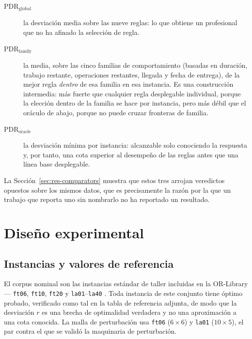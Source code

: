 \documentclass[a4paper,fleqn]{cas-sc}
\begin{document}
\begin{description}
\item[$\mathrm{PDR}_{\mathrm{global}}$] la desviación media sobre las nueve
reglas: lo que obtiene un profesional que no ha afinado la selección de regla.
\item[$\mathrm{PDR}_{\mathrm{family}}$] la media, sobre las cinco familias de
comportamiento (basadas en duración, trabajo restante, operaciones restantes,
llegada y fecha de entrega), de la mejor regla \emph{dentro} de esa familia en
esa instancia. Es una construcción intermedia: más fuerte que cualquier regla
desplegable individual, porque la elección dentro de la familia se hace por
instancia, pero más débil que el oráculo de abajo, porque no puede cruzar
fronteras de familia.
\item[$\mathrm{PDR}_{\mathrm{oracle}}$] la desviación mínima por instancia:
alcanzable solo conociendo la respuesta y, por tanto, una cota superior al
desempeño de las reglas antes que una línea base desplegable.
\end{description}

La Sección~\ref{sec:res-comparators} muestra que estos tres arrojan veredictos
opuestos sobre los mismos datos, que es precisamente la razón por la que un
trabajo que reporta uno sin nombrarlo no ha reportado un resultado.

\section{Diseño experimental}\label{sec:design}

\subsection{Instancias y valores de referencia}

El corpus nominal son las \NInstances{} instancias estándar de taller incluidas
en la OR-Library --- \texttt{ft06}, \texttt{ft10}, \texttt{ft20}
\citep{fisher1963} y \texttt{la01}--\texttt{la40} \citep{lawrence1984}. Toda
instancia de este conjunto tiene óptimo probado, verificado como tal en la tabla
de referencia adjunta, de modo que la desviación $r$ es una brecha de
optimalidad verdadera y no una aproximación a una cota conocida. La malla de
perturbación usa \texttt{ft06} ($6\times6$) y \texttt{la01} ($10\times5$), el
par contra el que se validó la maquinaria de perturbación.
\end{document}
